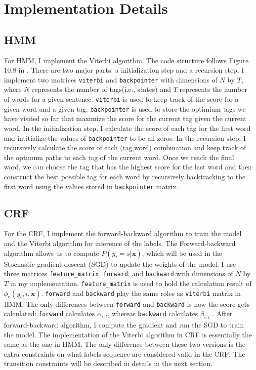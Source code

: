 \documentclass[11pt,a4paper]{article}
\begin{document}
\section{Implementation Details}

\subsection{HMM}

For HMM, I implement the Viterbi algorithm. 
The code structure follows Figure 10.8 in \citet{Jurafsky:2017}. There
are two major parts: a initialization step and a recursion step. I implement two matrices
\verb|viterbi| and \verb|backpointer| with dimensions of $N$ by $T$, where
$N$ represents the number of tags(i.e., states) and $T$ represents the number of
words for a given sentence. \verb|viterbi| is used to keep track of the score for 
a given word and a given tag. \verb|backpointer| is used to store the optimium 
tags we have visited so far that maximize the score for the current tag given
the current word. In the initialization step, I calculate the score of each tag
for the first word and intitialize the values of \verb|backpointer| to be all zeros. In the recursion
step, I recursively calculate the score of each (tag,word) combination and keep track
of the optimum paths to each tag of the current word. Once we reach the final word, we can choose the tag that has the
highest score for the last word and then construct the best possible tag for each
word by recursively backtracking to the first word using the values stored 
in \verb|backpointer| matrix.

\subsection{CRF}

For the CRF, I implement the forward-backward
algorithm to train the model and the Viterbi algorithm for inference of the labels.
The Forward-backward algorithm allows us to compute $P(y_i = s|\boldsymbol{x})$,
which will be used in the Stochastic gradient descent (SGD) to update the weights of the model.
I use three matrices \verb|feature_matrix|, \verb|forward|, and \verb|backward| with dimensions
of $N$ by $T$ in my implementation. \verb|feature_matrix| is used to hold the calculation result
of $\phi_e(y_i,i,\boldsymbol{x})$. \verb|forward| and \verb|backward|
play the same roles as \verb|viterbi| matrix in HMM. The only differences between \verb|forward| and
\verb|backward| is how the score gets calculated: \verb|forward| calculates $\alpha_{i,t}$, whereas \verb|backward|
calculates $\beta_{i,t}$ \cite{Marsland:2014}. After forward-backward algorithm, I compute the gradient and
run the SGD to train the model. The implementation of the Viterbi algorithm in CRF is essentially
the same as the one in HMM. The only difference between these two versions is the extra constraints
on what labels sequence are considered valid in the CRF. The transition constraints
will be described in details in the next section.
\end{document}
